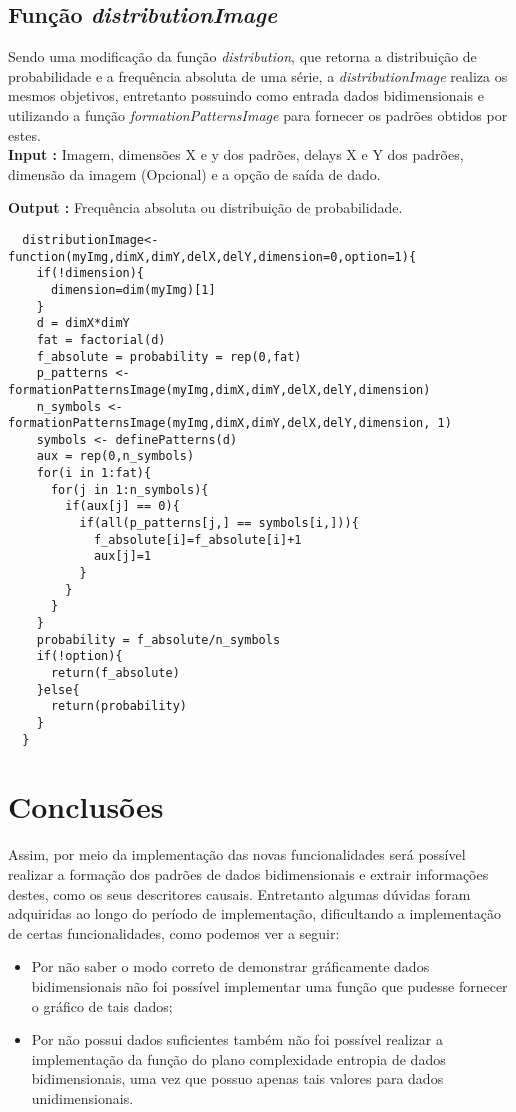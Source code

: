 \documentclass[12pt,letterpaper]{article}
\begin{document}
\subsection{Função \textit{distributionImage}}

Sendo uma modificação da função \textit{distribution}, que retorna a distribuição de probabilidade e a frequência absoluta de uma série, a \textit{distributionImage} realiza os mesmos objetivos, entretanto possuindo como entrada dados bidimensionais e utilizando a função \textit{formationPatternsImage} para fornecer os padrões obtidos por estes.\\

\textbf{Input :} Imagem, dimensões X e y dos padrões, delays X e Y dos padrões, dimensão da imagem (Opcional) e a opção de saída de dado.

\textbf{Output :} Frequência absoluta ou distribuição de probabilidade.\\

 \begin{lstlisting}
  distributionImage<-function(myImg,dimX,dimY,delX,delY,dimension=0,option=1){  
    if(!dimension){
      dimension=dim(myImg)[1]
    }
    d = dimX*dimY
    fat = factorial(d)
    f_absolute = probability = rep(0,fat)  
    p_patterns <- formationPatternsImage(myImg,dimX,dimY,delX,delY,dimension)
    n_symbols <- formationPatternsImage(myImg,dimX,dimY,delX,delY,dimension, 1)
    symbols <- definePatterns(d)
    aux = rep(0,n_symbols)  
    for(i in 1:fat){
      for(j in 1:n_symbols){
        if(aux[j] == 0){
          if(all(p_patterns[j,] == symbols[i,])){ 
            f_absolute[i]=f_absolute[i]+1
            aux[j]=1
          }
        }
      }
    }
    probability = f_absolute/n_symbols
    if(!option){
      return(f_absolute)
    }else{
      return(probability)
    }
  }
\end{lstlisting}

\section{Conclusões\label{sec:conclusions}}

Assim, por meio da implementação das novas funcionalidades será possível realizar a formação dos padrões de dados bidimensionais e extrair informações destes, como os seus descritores causais. Entretanto algumas dúvidas foram adquiridas ao longo do período de implementação, dificultando a implementação de certas funcionalidades, como podemos ver a seguir:

\begin{itemize}
\item Por não saber o modo correto de demonstrar gráficamente dados bidimensionais não foi possível implementar uma função que pudesse fornecer o gráfico de tais dados;

\item Por não possui dados suficientes também não foi possível realizar a implementação da função do plano complexidade entropia de dados bidimensionais, uma vez que possuo apenas tais valores para dados unidimensionais.
\end{itemize}
		
\end{document}
